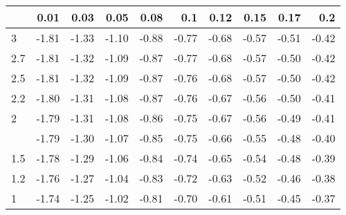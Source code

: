 
\begin{tabular}{lrrrrrrrrr}
\toprule
  & 0.01 & 0.03 & 0.05 & 0.08 & 0.1 & 0.12 & 0.15 & 0.17 & 0.2\\
\midrule
3 & -1.81 & -1.33 & -1.10 & -0.88 & -0.77 & -0.68 & -0.57 & -0.51 & -0.42\\
2.7 & -1.81 & -1.32 & -1.09 & -0.87 & -0.77 & -0.68 & -0.57 & -0.50 & -0.42\\
2.5 & -1.81 & -1.32 & -1.09 & -0.87 & -0.76 & -0.68 & -0.57 & -0.50 & -0.42\\
2.2 & -1.80 & -1.31 & -1.08 & -0.87 & -0.76 & -0.67 & -0.56 & -0.50 & -0.41\\
2 & -1.79 & -1.31 & -1.08 & -0.86 & -0.75 & -0.67 & -0.56 & -0.49 & -0.41\\
\addlinespace
1.7 & -1.79 & -1.30 & -1.07 & -0.85 & -0.75 & -0.66 & -0.55 & -0.48 & -0.40\\
1.5 & -1.78 & -1.29 & -1.06 & -0.84 & -0.74 & -0.65 & -0.54 & -0.48 & -0.39\\
1.2 & -1.76 & -1.27 & -1.04 & -0.83 & -0.72 & -0.63 & -0.52 & -0.46 & -0.38\\
1 & -1.74 & -1.25 & -1.02 & -0.81 & -0.70 & -0.61 & -0.51 & -0.45 & -0.37\\
\bottomrule
\end{tabular}
